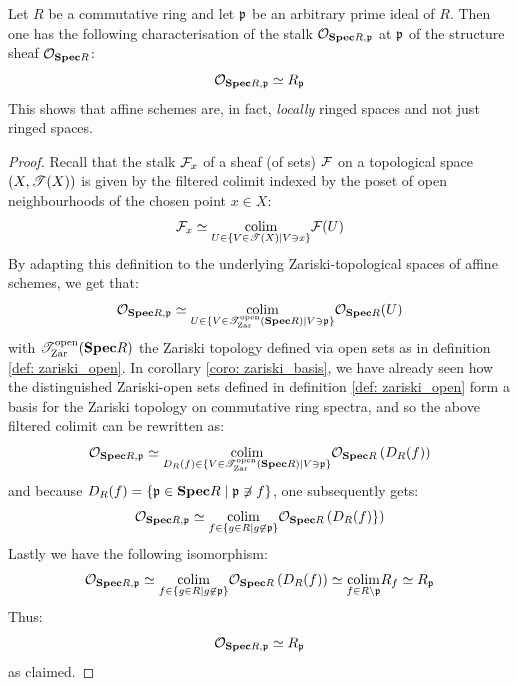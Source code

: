                 \begin{corollary} \label{coro: structure_sheaf_properties}
                    Let $R$ be a commutative ring and let $\mathfrak{p}$ be an arbitrary prime ideal of $R$. Then one has the following characterisation of the stalk $\mathcal{O}_{\mathbf{Spec} R, \mathfrak{p}}$ at $\mathfrak{p}$ of the structure sheaf $\mathcal{O}_{\mathbf{Spec} R}$:
                        $$\mathcal{O}_{\mathbf{Spec} R, \mathfrak{p}} \simeq R_{\mathfrak{p}}$$
                    This shows that affine schemes are, in fact, \textit{locally} ringed spaces and not just ringed spaces. 
                \end{corollary} 
                    \begin{proof}
                        Recall that the stalk $\mathcal{F}_x$ of a sheaf (of sets) $\mathcal{F}$ on a topological space $(X, \mathscr{T}(X))$ is given by the filtered colimit indexed by the poset of open neighbourhoods of the chosen point $x \in X$:
                            $$\mathcal{F}_x \simeq \underset{U \in \{V \in \mathscr{T}(X) \mid V \ni x\}}{\operatorname{colim}} \mathcal{F}(U)$$
                        By adapting this definition to the underlying Zariski-topological spaces of affine schemes, we get that:
                            $$\mathcal{O}_{\mathbf{Spec} R, \mathfrak{p}} \simeq \underset{U \in \{V \in \mathscr{T}_{\mathrm{Zar}}^{\mathrm{open}}(\mathbf{Spec} R) \mid V \ni \mathfrak{p}\}}{\operatorname{colim}} \mathcal{O}_{\mathbf{Spec} R}(U)$$
                        with $\mathscr{T}_{\mathrm{Zar}}^{\mathrm{open}}(\mathbf{Spec} R)$ the Zariski topology defined via open sets as in definition \ref{def: zariski_open}. In corollary \ref{coro: zariski_basis}, we have already seen how the distinguished Zariski-open sets defined in definition \ref{def: zariski_open} form a basis for the Zariski topology on commutative ring spectra, and so the above filtered colimit can be rewritten as:
                            $$\mathcal{O}_{\mathbf{Spec} R, \mathfrak{p}} \simeq \underset{D_R(f) \in \{V \in \mathscr{T}_{\mathrm{Zar}}^{\mathrm{open}}(\mathbf{Spec} R) \mid V \ni \mathfrak{p}\}}{\operatorname{colim}} \mathcal{O}_{\mathbf{Spec} R}\left(D_R(f)\right)$$
                        and because $D_R(f) = \{\mathfrak{p} \in \mathbf{Spec} R \mid \mathfrak{p} \not \ni f\}$, one subsequently gets:
                            $$\mathcal{O}_{\mathbf{Spec} R, \mathfrak{p}} \simeq \underset{f \in \{g \in R \mid g \not \in \mathfrak{p}\}}{\operatorname{colim}} \mathcal{O}_{\mathbf{Spec} R}\left(D_R(f)\}\right)$$
                        Lastly we have the following isomorphism:
                            $$\mathcal{O}_{\mathbf{Spec} R, \mathfrak{p}} \simeq \underset{f \in \{g \in R \mid g \not \in \mathfrak{p}\}}{\operatorname{colim}} \mathcal{O}_{\mathbf{Spec} R}\left(D_R(f)\right) \simeq \underset{f \in R \setminus \mathfrak{p}}{\operatorname{colim}} R_f \simeq R_{\mathfrak{p}}$$
                        Thus:
                            $$\mathcal{O}_{\mathbf{Spec} R, \mathfrak{p}} \simeq R_{\mathfrak{p}}$$
                        as claimed.
                    \end{proof}
                    
